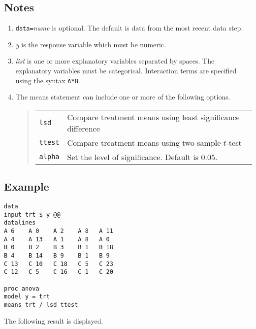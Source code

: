 \documentclass[11pt]{article}
\begin{document}
\subsection*{Notes}
\begin{enumerate}
\item
{\tt data=}{\it name} is optional.
The default is data from the most recent data step.
\item
{\it y} is the response variable which must be numeric.
\item
{\it list} is one or more explanatory variables separated by spaces.
The explanatory variables must be categorical.
Interaction terms are specified using the syntax {\tt A*B}.
\item
The means statement can include one or more of the following options.
\begin{quote}
\begin{tabular}{ll}
{\tt lsd} & Compare treatment means using least significance difference \\
{\tt ttest} & Compare treatment means using two sample $t$-test \\
{\tt alpha} & Set the level of significance. Default is $0.05$.
\end{tabular}
\end{quote}
\end{enumerate}

\subsection*{Example}
\begin{Verbatim}
data
input trt $ y @@
datalines
A 6    A 0    A 2    A 8   A 11
A 4    A 13   A 1    A 8   A 0
B 0    B 2    B 3    B 1   B 18
B 4    B 14   B 9    B 1   B 9
C 13   C 10   C 18   C 5   C 23
C 12   C 5    C 16   C 1   C 20

proc anova
model y = trt
means trt / lsd ttest
\end{Verbatim}

The following result is displayed.
\end{document}
